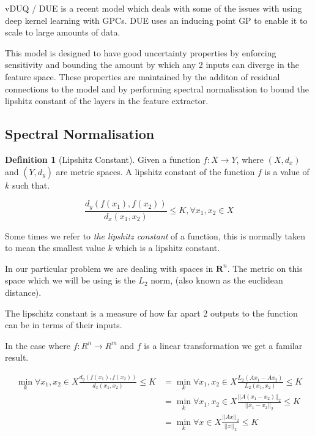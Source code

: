 \documentclass[12pt, a4paper]{report}
\theoremstyle{definition}
\newtheorem{definition}{Definition}[section]
\begin{document}
vDUQ / DUE \cite{vanamersfoort2020uncertainty} is a recent model which deals with some of the issues with using deep kernel learning with GPCs. DUE uses an inducing point GP to enable it to scale to large amounts of data.

This model is designed to have good uncertainty properties by enforcing sensitivity and bounding the amount by which any 2 inputs can diverge in the feature space. These properties are maintained by the additon of residual connections to the model and by performing spectral normalisation to bound the lipshitz constant of the layers in the feature extractor.

\subsection{Spectral Normalisation}

\begin{definition}[Lipshitz Constant]
    Given a function $f: X \rightarrow Y$, where $(X, d_x)$ and $(Y, d_y)$ are metric spaces. A lipshitz constant of the function $f$ is a value of $k$ such that.

    $$\frac{d_y(f(x_1), f(x_2))}{d_x(x_1, x_2)} \leq K, \forall x_1, x_2 \in X $$
\end{definition}

Some times we refer to \textit{the lipshitz constant} of a function, this is normally taken to mean the smallest value $k$ which is a lipshitz constant.

In our particular problem we are dealing with spaces in $\mathbf{R}^n$. The metric on this space which we will be using is the $L_2$ norm, (also known as the euclidean distance).

The lipschitz constant is a measure of how far apart 2 outputs to the function can be in terms of their inputs.

In the case where $f: R^n \rightarrow R^m$ and $f$ is a linear transformation we get a familar result.

\begin{align*}
    \min_k  \forall x_1,x_2 \in X \frac{d_y(f(x_1), f(x_2))}{d_x(x_1, x_2)} \leq K &= \min_k \forall x_1,x_2 \in X \frac{ L_2(Ax_1 - Ax_2)  }{ L_2(x_1, x_2)} \leq K \\
    &=  \min_k \forall x_1,x_2 \in X  \frac{ ||A(x_1 - x_2)||_2  }{ ||x_1- x_2||_2 } \leq K \\
    &=  \min_k \forall x \in X  \frac{ ||Ax||_2  }{ ||x||_2 } \leq K \\
\end{align*}
\end{document}
